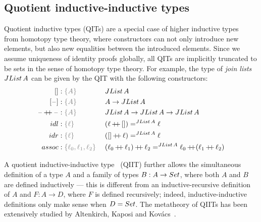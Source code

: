 \documentclass[a4paper,UKenglish,numberwithinsect,cleveref,thm-restate]{lipics-v2021}
\newcommand{\LT}[2][]{\todo[inline,author={L-T},caption={},color={pink},#1]{#2}}
\begin{document}


\subsection{Quotient inductive-inductive types}

Quotient inductive types (QITs) are a special case of higher inductive types~\cite{Lumsdaine2020} from homotopy type theory, where constructors can not only introduce new elements, but also new equalities between the introduced elements.
%
Since we assume uniqueness of identity proofs globally, all QITs are implicitly truncated to be sets in the sense of homotopy type theory.
%
For example, the type of \emph{join lists} $\JList{A}$ can be given by the QIT
with the following constructors:
\begin{alignat*}{3}
  \Jnil                    & : \implicit{A}      && \JList{A} \\
  \Jsing{\blank}           & : \implicit{A}      && A \to \JList{A} \\
  \Jconcat{\blank}{\blank} & : \implicit{A}      && \JList{A} \to \JList{A} \to \JList{A} \\
  \mathsf{idl}             & : \implicit{\ell}\; && (\Jconcat{\ell}{\Jnil}) =^{\JList{A}} \ell \\
  \mathsf{idr}             & : \implicit{\ell}\; && (\Jconcat{\Jnil}{\ell}) =^{\JList{A}} \ell \\
  \mathsf{assoc}           & : \implicit{\ell_0, \ell_1, \ell_2}\; && \Jconcat{(\Jconcat{\ell_0}{\ell_1})}{\ell_2} =^{\JList{A}} \Jconcat{\ell_0}{(\Jconcat{\ell_1}{\ell_2})}
\end{alignat*}


A quotient inductive-inductive type~\cite{Altenkirch2018} (QIIT) further allows the simultaneous definition of a type $A$ and a family of types $B : A \to \Set$, where both $A$ and $B$ are defined inductively --- this is different from an inductive-recursive definition of $A$ and $F : A \to D$, where $F$ is defined recursively; indeed, inductive-inductive definitions only make sense when $D = \Set$.
The metatheory of QIITs has been extensively studied by Altenkirch, Kaposi and Kov\'acs~\cite{Kaposi2018,Kaposi2019,Kovacs2020}.
\end{document}
